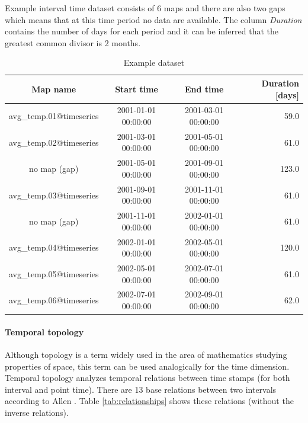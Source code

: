 \documentclass[a4paper,12pt,oneside]{book}
\begin{document}
Example interval time dataset consists of 6 maps and
there are also two gaps which means that at this time period no data are available.
The column \emph{Duration} contains the number of days for each period and it can be inferred
that the greatest common divisor is 2 months.
\begin{table}[ht!]
  \centering
  \small
  \caption{Example dataset}
  \label{tab:granularity}
\setlength{\extrarowheight}{3pt}
\begin{tabular}{cccr}
\toprule
 Map name & Start time & End time & Duration [days]\\\midrule
avg\_temp.01@timeseries &    2001-01-01 00:00:00  &   2001-03-01 00:00:00  &   59.0\\
avg\_temp.02@timeseries  &  2001-03-01 00:00:00  &   2001-05-01 00:00:00   &  61.0\\
no map (gap)    &  2001-05-01 00:00:00    & 2001-09-01 00:00:00   &  123.0\\
avg\_temp.03@timeseries     & 2001-09-01 00:00:00   &  2001-11-01 00:00:00  &   61.0\\
no map (gap) &   2001-11-01 00:00:00   &  2002-01-01 00:00:00  &   61.0 \\
avg\_temp.04@timeseries  &    2002-01-01 00:00:00   &  2002-05-01 00:00:00     & 120.0 \\
avg\_temp.05@timeseries  &      2002-05-01 00:00:00 &    2002-07-01 00:00:00 &    61.0 \\
avg\_temp.06@timeseries &     2002-07-01 00:00:00  &   2002-09-01 00:00:00   &  62.0\\
\bottomrule
\end{tabular}
\end{table}


\paragraph{Temporal topology}
\label{sec:temporalTopology}
Although topology is a term widely used in the area of mathematics studying properties of space,
this term can be used analogically for the time dimension.
Temporal topology analyzes temporal relations between time stamps (for both interval and point time).
There are 13 base relations between two intervals according to Allen \cite{relationships}.
Table \ref{tab:relationships} shows these relations (without the inverse relations).
\end{document}
